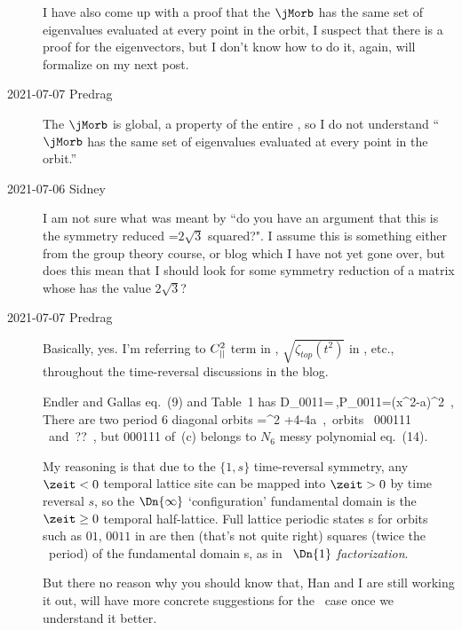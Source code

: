 \begin{description}
I have also
come up with a proof that the $\jMorb$ has the same set of eigenvalues
evaluated at every point in the orbit, I suspect that there is a proof for
the eigenvectors, but I don't know how to do it, again, will formalize on my
next post.

\item[2021-07-07 Predrag]
The {\jacobianOrb} $\jMorb$ is global, a property of the entire
{\lattstate}, so I do not understand ``$\jMorb$ has the same set of eigenvalues
evaluated at every point in the orbit.''

\item[2021-07-06 Sidney]
I am not sure what was meant by ``do you have an argument that this is the
symmetry reduced {\HillDet}=$2\sqrt{3}$ squared?". I assume this is something
either from the group theory course, or blog which I have not yet gone over,
but does this mean that I should look for some symmetry reduction of a matrix
whose {\HillDet} has the value $2\sqrt{3}$?

\item[2021-07-07 Predrag]
Basically, yes.
I'm referring to $C_{||}^2$ term in ,
$\sqrt{\zeta_{top}(t^2)}$ in , etc., throughout the
time-reversal discussions in the blog.

Endler and Gallas eq.~(9) and Table~1 has
\beq
D_{0011}=\sigma\,,\quad P_{0011}=(x^2-a)^2
\,,
There are two period 6 diagonal orbits
\beq
{}=\sigma^2 +4\sigma-4a \,,\quad \mbox{ orbits } {000111} \mbox{ and ??}
\,,
but 000111 of \,(c) belongs to $N_6$ messy polynomial eq.~(14).

My reasoning is that due to the $\{1,s\}$ time-reversal symmetry, any
$\zeit<0$ temporal lattice site can be mapped into $\zeit>0$ by time
reversal $s$, so the $\Dn{\infty}$ `configuration' fundamental domain is
the $\zeit\geq0$ temporal half-lattice. Full lattice periodic states
{\HillDet}s for orbits such as $01$, $0011$ in  are
then (that's not quite right) squares (twice the \rpo\ period) of the
fundamental domain {\orbit} {\HillDet}s, as in
~{\em $\Dn{1}$ factorization}.

But there no reason why you should know that,
Han and I are still working it out, will have more concrete suggestions for
the \Henon\ case once we understand it better.



\end{description}
